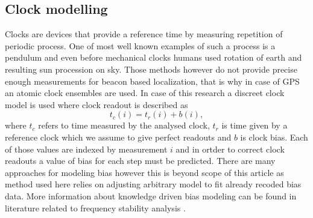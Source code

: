 \documentclass{article}
\begin{document}
\subsection{Clock modelling}
Clocks are devices that provide a reference time by measuring repetition of periodic 
process. One of most well known examples of such a process is a pendulum and even before
mechanical clocks humans used rotation of earth and resulting sun procession on sky.
Those methods however do not provide precise enough measurements for beacon based localization,
that is why in case of GPS an atomic clock ensembles are used.
In case of this research a discreet clock model is used where clock readout is described as 
\begin{equation}
	t_{c}(i) = t_{r}(i) + b(i),
\end{equation}
where $t_{c}$ refers to time measured by the analysed clock, $t_{r}$ is time given by a 
reference clock which we assume to give perfect readouts and $b$ is clock bias.
Each of those values are indexed by measurement $i$ and in ortder to correct clock readouts
a value of bias for each step must be predicted.
There are many approaches for modeling bias however this is beyond scope of this article
as method used here relies on adjusting arbitrary model to fit already recoded bias data.
More information about knowledge driven bias modeling can be found in literature related to
frequency stability analysis \cite{Riley2007}.

\end{document}
